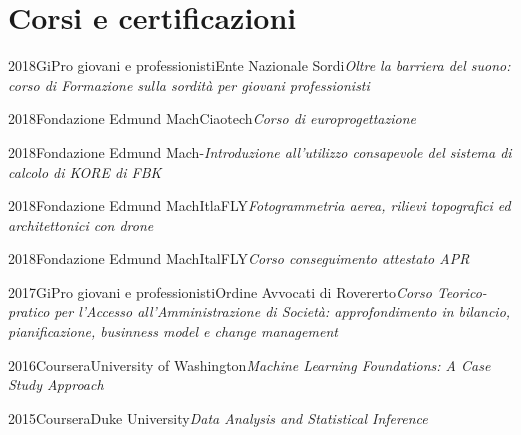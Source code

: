 \documentclass{curriculum}
\begin{document}
    \section{Corsi e certificazioni}
    
    \begin{entrylist}
    \entry
        {2018}{GiPro giovani e professionisti}{Ente Nazionale Sordi}{\emph{Oltre la barriera del suono: corso di Formazione sulla sordità per giovani professionisti}}
    \end{entrylist}
    
    \begin{entrylist}
    \entry
        {2018}{Fondazione Edmund Mach}{Ciaotech}{\emph{Corso di europrogettazione}}
    \end{entrylist}
    
    \begin{entrylist}
    \entry
        {2018}{Fondazione Edmund Mach}{-}{\emph{Introduzione all'utilizzo consapevole del sistema di calcolo di KORE di FBK}}
    \end{entrylist}
    
    \begin{entrylist}
    \entry
        {2018}{Fondazione Edmund Mach}{ItlaFLY}{\emph{Fotogrammetria aerea, rilievi topografici ed architettonici con drone}}
    \end{entrylist}
   
    \begin{entrylist}
    \entry
        {2018}{Fondazione Edmund Mach}{ItalFLY}{\emph{Corso conseguimento attestato APR}}
    \end{entrylist}
    
    \begin{entrylist}
    \entry
        {2017}{GiPro giovani e professionisti}{Ordine Avvocati di Rovererto}{\emph{Corso Teorico-pratico per l'Accesso all'Amministrazione di Società: approfondimento in bilancio, pianificazione, businness model e change management}}
    \end{entrylist} 
    
    \begin{entrylist}
    \entry
        {2016}{Coursera}{University of Washington}{\emph{Machine Learning Foundations: A Case Study Approach}}
    \end{entrylist}
    
    \begin{entrylist}
    \entry
        {2015}{Coursera}{Duke University}{\emph{Data Analysis and Statistical Inference}}
    \end{entrylist}
    
\end{document}

